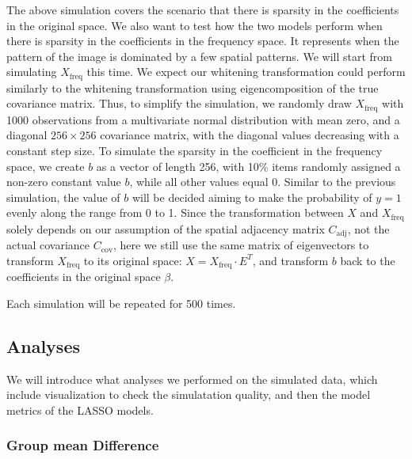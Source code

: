 \documentclass[12pt]{article}
\begin{document}
The above simulation covers the scenario that there is sparsity in the coefficients in the original space. We also want to test how the two models perform when there is sparsity in the coefficients in the frequency space. It represents when the pattern of the image is dominated by a few spatial patterns. We will start from simulating \( X_{\text{freq}} \) this time. We expect our whitening transformation could perform similarly to the whitening transformation using eigencomposition of the true covariance matrix. Thus, to simplify the simulation, we randomly draw \( X_{\text{freq}} \) with 1000 observations from a multivariate normal distribution with mean zero, and a diagonal \( 256 \times 256 \) covariance matrix, with the diagonal values decreasing with a constant step size. To simulate the sparsity in the coefficient in the frequency space, we create \( b \) as a vector of length 256, with 10\% items randomly assigned a non-zero constant value \( b \), while all other values equal 0. Similar to the previous simulation, the value of \( b \) will be decided aiming to make the probability of \( y=1 \) evenly along the range from 0 to 1. Since the transformation between \( X \) and \( X_{\text{freq}} \) solely depends on our assumption of the spatial adjacency matrix \( C_{\text{adj}} \), not the actual covariance \( C_{\text{cov}} \), here we still use the same matrix of eigenvectors to transform \( X_{\text{freq}} \) to its original space: \( X = X_{\text{freq}} \cdot E^T \), and transform \( b \) back to the coefficients in the original space \( \beta \).

Each simulation will be repeated for 500 times.

\subsection{Analyses}

We will introduce what analyses we performed on the simulated data, which include visualization to check the simulatation quality, and then the model metrics of the LASSO models.

\subsubsection{Group mean Difference}
\end{document}
